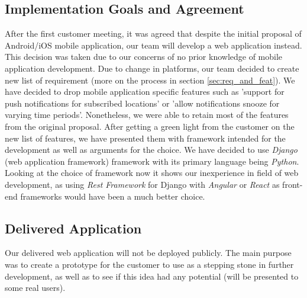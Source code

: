 \documentclass{l3proj}
\begin{document}
    \subsection{Implementation Goals and Agreement}
    \label{sec:imp_and_agr}
        After the first customer meeting, it was agreed that despite the initial proposal of Android/iOS mobile application, our team will develop a web application instead. This decision was taken due to our concerns of no prior knowledge of mobile application development.
        \newline
        Due to change in platforms, our team decided to create new list of requirement (more on the process in section \ref{sec:req_and_feat}). We have decided to drop mobile application specific features such as 'support for push notifications for subscribed locations' or 'allow notifications snooze for varying time periods'. Nonetheless, we were able to retain most of the features from the original proposal. After getting a green light from the customer on the new list of features, we have presented them with framework intended for the development as well as arguments for the choice. We have decided to use \textit{Django} (web application framework) \cite{Django} framework with its primary language being \textit{Python}.\\
        \newline
        Looking at the choice of framework now it shows our inexperience in field of web development, as using \textit{Rest Framework}\cite{rest} for Django with \textit{Angular}\cite{angular} or \textit{React}\cite{react} as front-end frameworks would have been a much better choice.
        
    \subsection{Delivered Application}
    \label{sec:delivered}
        Our delivered web application will not be deployed publicly. The main purpose was to create a prototype for the customer to use as a stepping stone in further development, as well as to see if this idea had any potential (will be presented to some real users). 






\newpage
\end{document}
